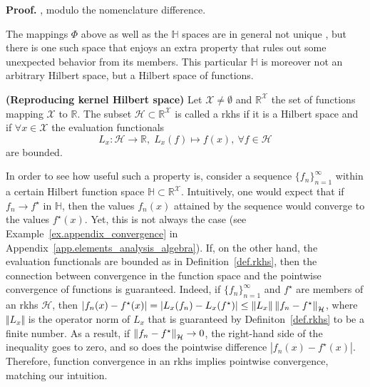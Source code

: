 \begin{my_proof}
	\textbf{Proof.}
	\cite[Theorem~4.16]{steinwart2008svm_book}, modulo the nomenclature difference.
\end{my_proof}

The mappings $\Phi$ above as well as the $\mathbb{H}$ spaces are in general not unique \citep[§4]{steinwart2008svm_book}, but there is one such space that enjoys an extra property that rules out some unexpected behavior from its members. This particular $\mathbb{H}$ is moreover not an arbitrary Hilbert space, but a Hilbert space of functions.

\begin{definition}
	\label{def.rkhs}
	\textbf{(Reproducing kernel Hilbert space)} 
	Let $\mathcal{X} \neq \emptyset$ and $\mathbb{R}^\mathcal{X}$ the set of functions mapping $\mathcal{X}$ to $\mathbb{R}$. The subset $\mathcal{H} \subset \mathbb{R}^\mathcal{X}$ is called a \ac{rkhs} if it is a Hilbert space and if $\forall x \in \mathcal{X}$ the evaluation functionals
	\begin{equation}
		L_x: \mathcal{H} \rightarrow \mathbb{R}, \; L_x(f) \mapsto f(x), \ \forall f\in \mathcal{H}
	\end{equation}
	are bounded.
\end{definition}

In order to see how useful such a property is, consider a sequence $\{f_n\}_{n=1}^\infty$ within a certain Hilbert function space $\mathbb{H} \subset \mathbb{R}^\mathcal{X}$. Intuitively, one would expect that if $f_n \rightarrow f^\star$ in $\mathbb{H}$, then the values $f_n(x)$ attained by the sequence would converge to the values $f^\star(x)$. Yet, this is not always the case (see Example~\ref{ex.appendix_convergence} in Appendix~\ref{app.elements_analysis_algebra}). If, on the other hand, the evaluation functionals are bounded as in Definition~\ref{def.rkhs}, then the connection between convergence in the function space and the pointwise convergence of functions is guaranteed. Indeed, if $\{f_n\}_{n=1}^\infty$ and $f^\star$ are members of an \ac{rkhs} $\mathcal{H}$, then $|f_n(x)-f^\star(x)| = | L_x(f_n) - L_x(f^\star)|  \leq \Vert L_x \Vert \left\| f_n - f^\star \right\|_\mathcal{H}$, where $\Vert L_x \Vert $ is the operator norm of $L_x$ that is guaranteed by Definiton~\ref{def.rkhs} to be a finite number. As a result, if $\left\| f_n - f^\star \right\|_\mathcal{H} \rightarrow 0$, the right-hand side of the inequality goes to zero, and so does the pointwise difference $|f_n(x)-f^\star(x)|$. Therefore, function convergence in an \ac{rkhs} implies pointwise convergence, matching our intuition.

